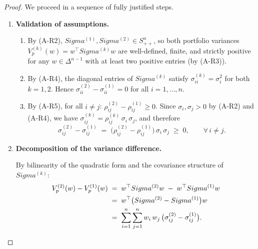 \documentclass[12pt,openany]{book}
\newcommand{\bfw}{\mathbf{w}}
\newcommand{\bfSigma}{\boldsymbol{\Sigma}}
\numberwithin{equation}{chapter}
\theoremstyle{plain}
\theoremstyle{definition}
\theoremstyle{remark}
\def\mathcal#1{#1}%
\def\bfw{w}%
\def\bfSigma{Sigma}%
\begin{document}
\begin{proof}
We proceed in a sequence of fully justified steps.

\begin{enumerate}
  \item \textbf{Validation of assumptions.}

        \begin{enumerate}
          \item[\textup{(a)}] By \textup{(A-R2)}, $\bfSigma^{(1)},
                \bfSigma^{(2)} \in \mathcal{S}_{++}^{n}$, so both portfolio
                variances $V_p^{(k)}(\bfw) = \bfw^\top \bfSigma^{(k)}
                \bfw$ are well-defined, finite, and strictly positive
                for any $\bfw \in \Delta^{n-1}$ with at least two
                positive entries (by \textup{(A-R3)}).
          \item[\textup{(b)}] By \textup{(A-R4)}, the diagonal entries
                of $\bfSigma^{(k)}$ satisfy
                $\sigma_{ii}^{(k)} = \sigma_i^2$ for both $k = 1, 2$.
                Hence $\sigma_{ii}^{(2)} - \sigma_{ii}^{(1)} = 0$ for
                all $i = 1, \ldots, n$.
          \item[\textup{(c)}] By \textup{(A-R5)}, for all $i \neq j$:
                $\rho_{ij}^{(2)} - \rho_{ij}^{(1)} \geq 0$.
                Since $\sigma_i, \sigma_j > 0$ by \textup{(A-R2)} and
                \textup{(A-R4)}, we have
                $\sigma_{ij}^{(k)} = \rho_{ij}^{(k)}\,\sigma_i\,\sigma_j$,
                and therefore
                \begin{equation}
                  \sigma_{ij}^{(2)} - \sigma_{ij}^{(1)}
                  \;=\; \bigl(\rho_{ij}^{(2)} - \rho_{ij}^{(1)}\bigr)
                        \,\sigma_i\,\sigma_j
                  \;\geq\; 0,
                  \qquad \forall\, i \neq j.
                  \label{eq:offdiag-diff}
                \end{equation}
        \end{enumerate}

  \item \textbf{Decomposition of the variance difference.}

        By bilinearity of the quadratic form and the covariance
        structure of $\bfSigma^{(k)}$:
        \begin{align}
          V_p^{(2)}(\bfw) - V_p^{(1)}(\bfw)
          &\;=\; \bfw^\top \bfSigma^{(2)} \bfw
                 \;-\; \bfw^\top \bfSigma^{(1)} \bfw
                 \notag \\
          &\;=\; \bfw^\top \bigl(\bfSigma^{(2)} - \bfSigma^{(1)}\bigr) \bfw
                 \notag \\
          &\;=\; \sum_{i=1}^{n} \sum_{j=1}^{n}
                 w_i\, w_j\,
                 \bigl(\sigma_{ij}^{(2)} - \sigma_{ij}^{(1)}\bigr).
          \label{eq:Vdiff-expand}
        \end{align}


\end{enumerate}
\end{proof}
\end{document}
